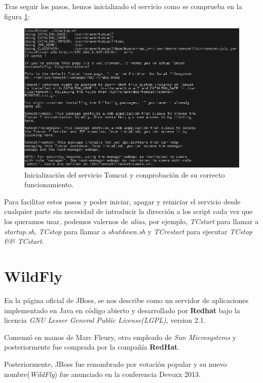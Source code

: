 \documentclass[a4paper, 10pt]{article}
\begin{document}
		Tras seguir los pasos, hemos inicializado el servicio como se comprueba en la figura
		\ref{fig:TC_Success}:
		
		\begin{figure}[h!]
			\includegraphics[width=15cm]{Success_TC.png}
			\caption{Inicialización del servicio Tomcat y comprobación de su correcto funcionamiento.}
			\label{fig:TC_Success}
		\end{figure}

		Para facilitar estos pasos y poder iniciar, apagar y reiniciar el servicio desde cualquier
		parte sin necesidad de introducir la dirección a los script cada vez que los queramos usar,
		podemos valernos de \textit{alias}, por ejemplo, \textit{TCstart} para llamar a \textit{
		startup.sh}, \textit{TCstop} para llamar a \textit{shutdown.sh} y \textit{TCrestart} para
		ejecutar \textit{TCstop \&\& TCstart}.
	
\section{WildFly}
	En la página oficial de JBoss\cite{JB_official}, se nos describe como un servidor de aplicaciones
	implementado en Java en código abierto y desarrollado por \textbf{Redhat} bajo la licencia
	\textit{GNU Lesser General Public License(LGPL)}, version 2.1.
	
	Comenzó en manos de Marc Fleury, otro empleado de \textit{Sun Microsystems} y posteriormente fue
	comprada por la compañía \textbf{RedHat}.

	Posteriormente, JBoss fue renombrado por votación popular\cite{JB_vote}\cite{WF_install} y su nuevo
	nombre(\textit{WildFly}) fue anunciado en la conferencia Devoxx 2013.\cite{WF_install}\cite{WF_name}
\end{document}

